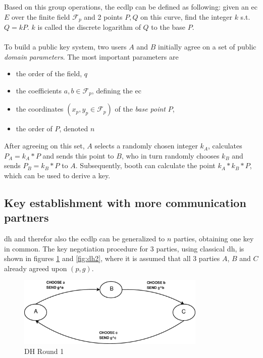 Based on this group operations, the \gls{ecdlp} \cite{ecdlp} can be defined as following: given an \gls{ec} $E$ over the finite field $\mathcal{F}_p$ and 2 points $P,Q$ on this curve, %
find the integer $k$ s.t. $Q = kP$. $k$ is called the discrete logarithm of $Q$ to the base $P$.
\\
\\
To build a public key system, two users $A$ and $B$ initially agree on a set of public \textit{domain parameters}. The most important parameters are \cite{ecDP}

\begin{itemize}
 \item the order of the field, $q$
 \item the coefficients $a, b \in \mathcal{F}_p$, defining the \gls{ec}
 \item the coordinates $(x_p, y_p \in \mathcal{F}_p)$ of the \textit{base point} $P$, 
 \item the order of $P$, denoted $n$
\end{itemize}
After agreeing on this set, $A$ selects a randomly chosen integer $k_A$, calculates $P_A = k_A*P$ and sends
this point to $B$, who in turn randomly chooses $k_B$ and sends $P_B = k_B*P$ to $A$. Subsequently, booth can calculate the point $k_A*k_B*P$, which can be used
to derive a key.

\subsection{Key establishment with more communication partners}
\gls{dh} and therefor also the \gls{ecdlp} can be generalized to $n$ parties, obtaining one key in common. The key negotiation procedure for 3 parties, using
classical \gls{dh}, is
shown in figures \ref{fig:dh1} and \ref{fig:dh2}, where it is assumed that all 3 parties $A$, $B$ and $C$ already agreed upon $(p,g)$.

\begin{figure}
    \centering
    \includegraphics[width=0.8\textwidth]{figures/dh-group_round1.eps}
    \caption{DH Round 1}
    \label{fig:dh1}
\end{figure}


